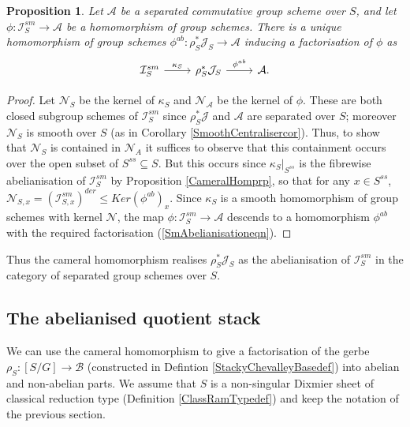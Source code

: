 \documentclass{amsart}
\newtheorem{proposition}[theorem]{Proposition}
\theoremstyle{remark}
\numberwithin{theorem}{section}
\numberwithin{equation}{section}
\begin{document}
\begin{proposition}\label{SmAbelianisationprp}
    Let $\mathcal A$ be a separated commutative group scheme over $S$, and let $\phi:\mathcal I_S^{sm} \rightarrow \mathcal A$ be a homomorphism of group schemes. There is a unique homomorphism of group schemes $\phi^{ab}:\rho_S^*\mathcal J_S \rightarrow \mathcal A$ inducing a factorisation of $\phi$ as
    \begin{equation}\label{SmAbelianisationeqn}
\begin{tikzcd}
\mathcal I_S^{sm} \arrow[r, "\kappa_S"] & \rho_S^*\mathcal J_S \arrow[r, "\phi^{ab}"] & \mathcal A.
\end{tikzcd}
    \end{equation}
\end{proposition}

\begin{proof} 
Let $\mathcal N_S$ be the kernel of $\kappa_S$ and $\mathcal N_\mathcal A$ be the kernel of $\phi$. These are both closed subgroup schemes of $\mathcal I_S^{sm}$ since $\rho_S^*\mathcal J$ and $\mathcal A$ are separated over $S$; moreover $\mathcal N_S$ is smooth over $S$ (as in Corollary \ref{SmoothCentralisercor}). Thus, to show that $\mathcal N_S$ is contained in $\mathcal N_A$ it suffices to observe that this containment occurs over the open subset of $S^{ss} \subseteq S$. But this occurs since $\kappa_S|_{S^{ss}}$ is the fibrewise abelianisation of $\mathcal I_S^{sm}$ by Proposition \ref{CameralHomprp}, so that for any $x \in S^{ss}$, $\mathcal N_{S,x} = (\mathcal I_{S,x}^{sm})^{der} \leq Ker(\phi^{ab})_x$. Since $\kappa_S$ is a smooth homomorphism of group schemes with kernel $\mathcal N$, the map $\phi:\mathcal I_S^{sm} \rightarrow \mathcal A$ descends to a homomorphism $\phi^{ab}$ with the required factorisation (\ref{SmAbelianisationeqn}).
\end{proof}

Thus the cameral homomorphism realises $\rho_S^*\mathcal J_S$ as the abelianisation of $\mathcal I_S^{sm}$ in the category of separated group schemes over $S$.

\subsection{The abelianised quotient stack}\label{AbQuotsbn}
We can use the cameral homomorphism to give a factorisation of the gerbe $\rho_S:[S/G] \rightarrow \mathcal B$ (constructed in Defintion \ref{StackyChevalleyBasedef}) into abelian and non-abelian parts. We assume that $S$ is a non-singular Dixmier sheet of classical reduction type (Definition \ref{ClassRamTypedef}) and keep the notation of the previous section.
\end{document}

